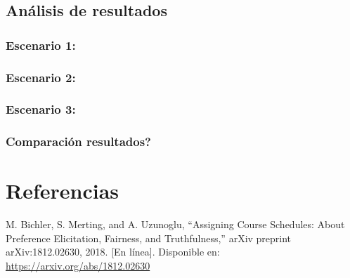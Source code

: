 \documentclass{article}
\begin{document}
\subsection{Análisis de resultados}

\subsubsection{Escenario 1: }

\subsubsection{Escenario 2: }
 
\subsubsection{Escenario 3: }

\subsubsection{Comparación resultados?}



\section{Referencias}
\renewcommand{\refname}{}

\begin{thebibliography}{9}

 \label{ref:BPS} M. Bichler, S. Merting, and A. Uzunoglu, 
“Assigning Course Schedules: About Preference Elicitation, Fairness, and Truthfulness,” 
arXiv preprint arXiv:1812.02630, 2018. [En línea]. Disponible en: 
\url{https://arxiv.org/abs/1812.02630}


\end{thebibliography}
\end{document}
